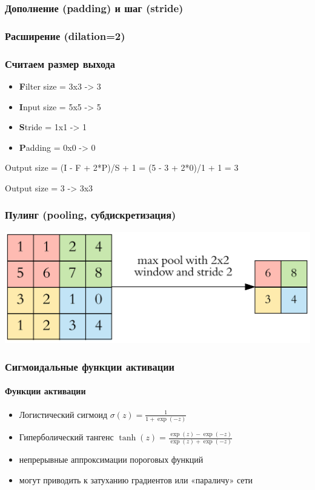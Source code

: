 \documentclass[fullscreen=true, bookmarks=true, hyperref={pdfencoding=unicode}]{beamer}
\begin{document}
\begin{frame}
  \frametitle{Дополнение (padding) и шаг (stride)}
  \begin{center}
  \end{center}
\end{frame}

\begin{frame}
  \frametitle{Расширение (dilation=2)}
  \begin{center}
  \end{center}
\end{frame}

\begin{frame}
  \frametitle{Считаем размер выхода}
  \begin{itemize}
    \item {\bf F}ilter size = 3x3 -> 3
    \item {\bf I}nput size = 5x5 -> 5
    \item {\bf S}tride = 1x1 -> 1
    \item {\bf P}adding = 0x0 -> 0
  \end{itemize}

  Output size = (I - F + 2*P)/S + 1 = (5 - 3 + 2*0)/1 + 1 = 3

  Output size = 3 -> 3x3
\end{frame}

\begin{frame}
  \frametitle{Пулинг (pooling, субдискретизация)}
  \begin{center}
    \includegraphics[keepaspectratio,
                     width=0.7\paperwidth]{max_pooling.png}
  \end{center}
\end{frame}

\begin{frame}
  \frametitle{Сигмоидальные функции активации}
  \framesubtitle{Функции активации}
  \begin{itemize}
    \item Логистический сигмоид
    $\sigma(z) = \frac{1}{1+\exp(-z)}$

    \item Гиперболический тангенс
    $\tanh(z) = \frac{\exp(z)-\exp(-z)}{\exp(z)+\exp(-z)}$

    \item непрерывные аппроксимации пороговых функций
    \item могут приводить к затуханию градиентов или «параличу» сети
  \end{itemize}
\end{frame}
\end{document}
